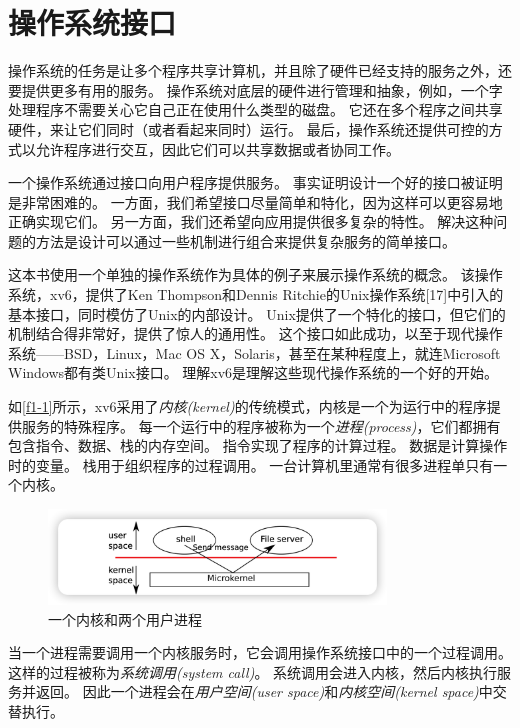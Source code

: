 \chapter{操作系统接口}\label{ch01}

操作系统的任务是让多个程序共享计算机，并且除了硬件已经支持的服务之外，还要提供更多有用的服务。
操作系统对底层的硬件进行管理和抽象，例如，一个字处理程序不需要关心它自己正在使用什么类型的磁盘。
它还在多个程序之间共享硬件，来让它们同时（或者看起来同时）运行。
最后，操作系统还提供可控的方式以允许程序进行交互，因此它们可以共享数据或者协同工作。

一个操作系统通过接口向用户程序提供服务。
事实证明设计一个好的接口被证明是非常困难的。
一方面，我们希望接口尽量简单和特化，因为这样可以更容易地正确实现它们。
另一方面，我们还希望向应用提供很多复杂的特性。
解决这种问题的方法是设计可以通过一些机制进行组合来提供复杂服务的简单接口。

这本书使用一个单独的操作系统作为具体的例子来展示操作系统的概念。
该操作系统，xv6，提供了Ken Thompson和Dennis Ritchie的Unix操作系统[17]中引入的基本接口，同时模仿了Unix的内部设计。
Unix提供了一个特化的接口，但它们的机制结合得非常好，提供了惊人的通用性。
这个接口如此成功，以至于现代操作系统——BSD，Linux，Mac OS X，Solaris，甚至在某种程度上，就连Microsoft Windows都有类Unix接口。
理解xv6是理解这些现代操作系统的一个好的开始。

如\autoref{f1-1}所示，xv6采用了\emph{内核(kernel)}的传统模式，内核是一个为运行中的程序提供服务的特殊程序。
每一个运行中的程序被称为一个\emph{进程(process)}，它们都拥有包含指令、数据、栈的内存空间。
指令实现了程序的计算过程。
数据是计算操作时的变量。
栈用于组织程序的过程调用。
一台计算机里通常有很多进程单只有一个内核。

\begin{figure}[htbp]
    \centering
    \includegraphics[width=0.8\textwidth]{../imgs/f1-1.png}
    \caption{一个内核和两个用户进程}
    \label{f1-1}
\end{figure}

当一个进程需要调用一个内核服务时，它会调用操作系统接口中的一个过程调用。
这样的过程被称为\emph{系统调用(system call)}。
系统调用会进入内核，然后内核执行服务并返回。
因此一个进程会在\emph{用户空间(user space)}和\emph{内核空间(kernel space)}中交替执行。

